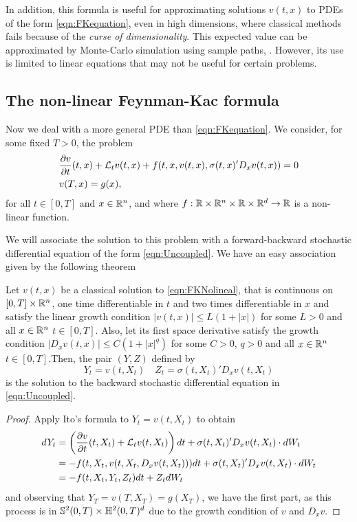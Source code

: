 In addition, this formula is useful for approximating solutions $v(t,x)$ to PDEs of the form \eqref{eqn:FKequation}, even in high dimensions, where classical methods fails because of the \textit{curse of dimensionality}. This expected value can be approximated by Monte-Carlo simulation using sample paths, . However, its use is limited to linear equations that may not be useful for certain problems.
\subsection{The non-linear Feynman-Kac formula}
Now we deal with a more general PDE than \eqref{eqn:FKequation}. We consider, for some fixed $T>0$, the problem 
\begin{equation}
	\label{eqn:FKNolineal}
	\begin{split}
		&\frac{\partial v}{\partial t}(t,x)+\mathcal{L}_t v(t,x)+f(t,x,v(t,x),\sigma(t,x)' D_x v(t,x))=0\\
		&v(T,x)=g(x),
	\end{split}
\end{equation}
for all $t\in[0,T]$ and $x\in\mathbb{R}^{n}$, and where $f:\mathbb{R}\times \mathbb{R}^n\times \mathbb{R} \times \mathbb{R}^d\to \mathbb{R}$ is a non-linear function.

We will associate the solution to this problem with a forward-backward stochastic differential equation of the form \eqref{eqn:Uncoupled}. We have an easy association given by the following theorem

\begin{theorem}
	Let $v(t,x)$ be a classical solution to \ref{eqn:FKNolineal}, that is continuous on $[0,T]\times \mathbb{R}^n$, one time differentiable in $t$ and two times differentiable in $x$ and satisfy the linear growth condition $|v(t,x)|\leq L(1+|x|)$ for some $L>0$ and all $x\in\mathbb{R}^n$ $t\in[0,T]$. Also, let its first space derivative satisfy the growth condition $|D_x v(t,x)|\leq C(1+|x|^q)$ for some $C>0$, $q>0$ and all $x\in\mathbb{R}^n$ $t\in[0,T]$.Then, the pair $(Y,Z)$ defined by
	\begin{equation}
		Y_t=v(t,X_t) \quad Z_t=\sigma(t,X_t)' D_x v(t,X_t)
	\end{equation}
is the solution to the backward stochastic differential equation in \ref{eqn:Uncoupled}.
\end{theorem}
\begin{proof}
	Apply Ito's formula to $Y_t=v(t,X_t)$ to obtain
	\begin{equation}
		\begin{split}
		dY_t&=\left(\frac{\partial v}{\partial t}(t,X_t)+\mathcal{L}_t v(t,X_t)\right)dt+\sigma(t,X_t)' D_x v(t,X_t)\cdot dW_t\\
		&=-f(t,X_t,v(t,X_t,D_x v(t,X_t)))dt+\sigma(t,X_t)' D_x v(t,X_t) \cdot dW_t\\
		&=-f(t,X_t,Y_t,Z_t)dt+Z_t dW_t
		\end{split}
	\end{equation}
and observing that $Y_T=v(T,X_T)=g(X_T)$, we have the first part, as this process is in $\mathbb{S}^2(0,T)\times \mathbb{H}^2(0,T)^d$ due to the growth condition of $v$ and $D_x v$.
\end{proof}

